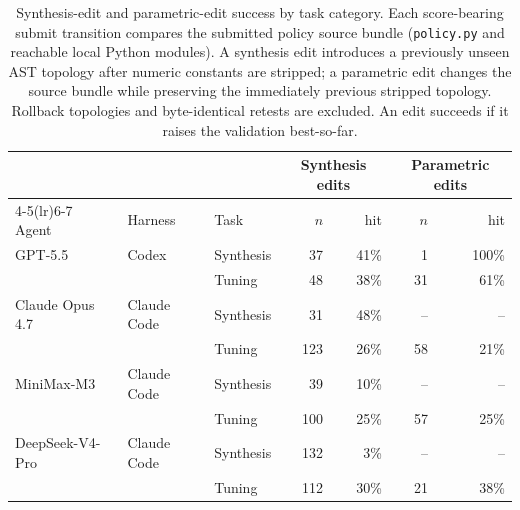 \begin{table}[H]
\caption{Synthesis-edit and parametric-edit success by task category. Each score-bearing submit
transition compares the submitted policy source bundle (\texttt{policy.py} and
reachable local Python modules). A synthesis edit introduces a previously
unseen AST topology after numeric constants are stripped; a parametric edit
changes the source bundle while preserving the immediately previous stripped
topology. Rollback topologies and byte-identical retests are excluded. An edit succeeds if it raises the validation best-so-far.}
\label{tab:edit-types}
\begin{center}
\small
\setlength{\tabcolsep}{4.8pt}
\begin{tabular}{lllrrrr}
\toprule
 & & & \multicolumn{2}{c}{Synthesis edits} & \multicolumn{2}{c}{Parametric edits} \\
\cmidrule(lr){4-5}\cmidrule(lr){6-7}
Agent & Harness & Task & $n$ & hit & $n$ & hit \\
\midrule
GPT-5.5 & Codex & Synthesis & 37 & 41\% & 1 & 100\% \\
 &  & Tuning & 48 & 38\% & 31 & {61\%} \\
\addlinespace
Claude Opus 4.7 & Claude Code & Synthesis & 31 & {48\%} & -- & -- \\
 &  & Tuning & 123 & 26\% & 58 & {21\%} \\
\addlinespace
MiniMax-M3 & Claude Code & Synthesis & 39 & {10\%} & -- & -- \\
 &  & Tuning & 100 & 25\% & 57 & {25\%} \\
\addlinespace
DeepSeek-V4-Pro & Claude Code & Synthesis & 132 & {3\%} & -- & -- \\
 &  & Tuning & 112 & 30\% & 21 & {38\%} \\
\bottomrule
\end{tabular}
\end{center}
\end{table}

